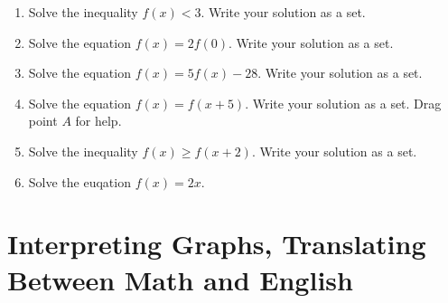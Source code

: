 \documentclass{ximera}
\begin{document}
\begin{example}
\begin{enumerate}

\item Solve the inequality $f(x)<3$. Write your solution as a set.


\item Solve the equation $f(x)=2f(0)$. Write your solution as a set.


\item Solve the equation $f(x)=5f(x) - 28$. Write your solution as a set.

\item Solve the equation $f(x) = f(x+5)$. Write your solution as a set. Drag point $A$ for help.



\item Solve the inequality $f(x)\geq f(x+2)$. Write your solution as a set.

\item Solve the euqation $f(x)=2x$.


\end{enumerate}
\end{example}



\section{Interpreting Graphs, Translating Between Math and English}
\end{document}
